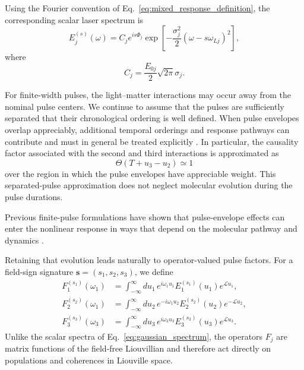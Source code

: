 Using the Fourier convention of
Eq.~\eqref{eq:mixed_response_definition}, the corresponding scalar
laser spectrum is
%
\begin{equation}
E_j^{(s)}(\omega)
=
C_j e^{is\Phi_j}
\exp\left[
-\frac{\sigma_j^2}{2}
\left(
\omega-s\omega_{Lj}
\right)^2
\right],
\label{eq:gaussian_spectrum}
\end{equation}
%
where
%
\begin{equation}
C_j
=
\frac{E_{0j}}{2}
\sqrt{2\pi}\sigma_j.
\label{eq:pulse_prefactor}
\end{equation}

For finite-width pulses, the light--matter interactions may occur away
from the nominal pulse centers. We continue to assume that the pulses
are sufficiently separated that their chronological ordering is well
defined. When pulse envelopes overlap appreciably, additional temporal
orderings and response pathways can contribute and must in general be
treated explicitly
\cite{RoseKrich2021DiagramGenerator}. In particular, the causality factor associated with the second
and third interactions is approximated as
%
\begin{equation}
\Theta(T+u_3-u_2)
\simeq
1
\label{eq:separated_pulse_condition}
\end{equation}
%
over the region in which the pulse envelopes have appreciable weight.
This separated-pulse approximation does not neglect molecular evolution
during the pulse durations.

Previous finite-pulse formulations have shown that pulse-envelope
effects can enter the nonlinear response in ways that depend on the
molecular pathway and dynamics
\cite{
Smallwood2017FinitePulse,
Perlik2017FinitePulse,
DoGelinTan2017FinitePulse}.

Retaining that evolution leads naturally to operator-valued pulse
factors. For a field-sign signature
$\mathbf{s}=(s_1,s_2,s_3)$, we define
%
\begin{align}
F_1^{(s_1)}(\omega_1)
&=
\int_{-\infty}^{\infty}
du_1\,
e^{i\omega_1u_1}
E_1^{(s_1)}(u_1)
e^{\mathcal{L}u_1},
\label{eq:F1}
\\
F_2^{(s_2)}(\omega_1)
&=
\int_{-\infty}^{\infty}
du_2\,
e^{-i\omega_1u_2}
E_2^{(s_2)}(u_2)
e^{-\mathcal{L}u_2},
\label{eq:F2}
\\
F_3^{(s_3)}(\omega_3)
&=
\int_{-\infty}^{\infty}
du_3\,
e^{i\omega_3u_3}
E_3^{(s_3)}(u_3)
e^{\mathcal{L}u_3}.
\label{eq:F3}
\end{align}
%
Unlike the scalar spectra of Eq.~\eqref{eq:gaussian_spectrum}, the
operators $F_j$ are matrix functions of the field-free Liouvillian and
therefore act directly on populations and coherences in Liouville
space.

